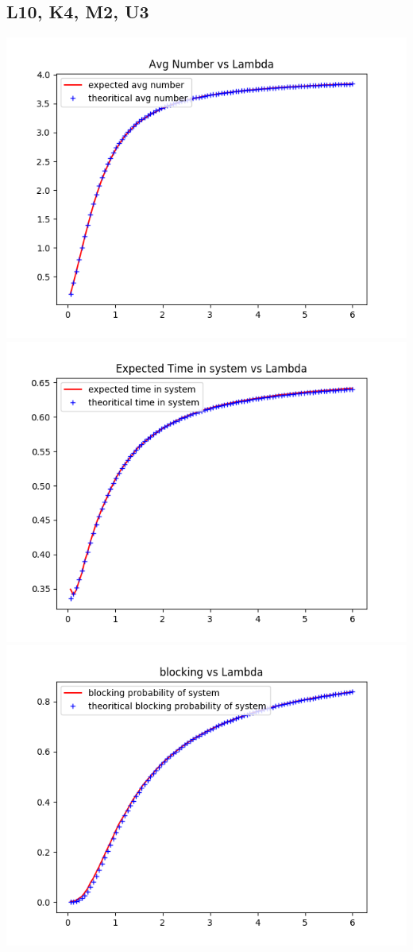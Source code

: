 \documentclass[11pt]{article}
\begin{document}
\subsection{L10, K4, M2, U3}
 \includegraphics{ExpectedNumber_L10_K4_M2_U3}
  \includegraphics{ExpectedTime_L10_K4_M2_U3}
 \includegraphics{BlockingProbability_L10_K4_M2_U3}
\end{document}
